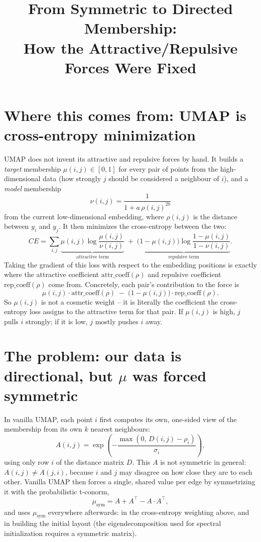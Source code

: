 \documentclass[11pt]{article}
\title{From Symmetric to Directed Membership:\\ How the Attractive/Repulsive Forces Were Fixed}
\author{}
\date{}
\begin{document}
\maketitle

\section{Where this comes from: UMAP is cross-entropy minimization}

UMAP does not invent its attractive and repulsive forces by hand. It builds a
\emph{target} membership $\mu(i,j) \in [0,1]$ for every pair of points from the
high-dimensional data (how strongly $j$ should be considered a neighbour of
$i$), and a \emph{model} membership
\[
  \nu(i,j) = \frac{1}{1 + a\,\rho(i,j)^{2b}}
\]
from the current low-dimensional embedding, where $\rho(i,j)$ is the distance
between $y_i$ and $y_j$. It then minimizes the cross-entropy between the two:
\[
  CE = \sum_{i,j}
  \underbrace{\mu(i,j)\log\frac{\mu(i,j)}{\nu(i,j)}}_{\text{attractive term}}
  \;+\;
  \underbrace{\bigl(1-\mu(i,j)\bigr)\log\frac{1-\mu(i,j)}{1-\nu(i,j)}}_{\text{repulsive term}}.
\]
Taking the gradient of this loss with respect to the embedding positions is
exactly where the attractive coefficient $\mathrm{attr\_coeff}(\rho)$ and
repulsive coefficient $\mathrm{rep\_coeff}(\rho)$ come from. Concretely, each
pair's contribution to the force is
\[
  \mu(i,j)\cdot \mathrm{attr\_coeff}(\rho) \;-\; \bigl(1-\mu(i,j)\bigr)\cdot \mathrm{rep\_coeff}(\rho).
\]
So $\mu(i,j)$ is not a cosmetic weight -- it is literally the coefficient the
cross-entropy loss assigns to the attractive term for that pair. If
$\mu(i,j)$ is high, $j$ pulls $i$ strongly; if it is low, $j$ mostly pushes
$i$ away.

\section{The problem: our data is directional, but $\mu$ was forced symmetric}

In vanilla UMAP, each point $i$ first computes its own, one-sided view of the
membership from its own $k$ nearest neighbours:
\[
  A(i,j) = \exp\!\left(-\frac{\max(0,\, D(i,j)-\rho_i)}{\sigma_i}\right),
\]
using only row $i$ of the distance matrix $D$. This $A$ is not symmetric in
general: $A(i,j) \neq A(j,i)$, because $i$ and $j$ may disagree on how close
they are to each other. Vanilla UMAP then forces a single, shared value per
edge by symmetrizing it with the probabilistic t-conorm,
\[
  \mu_{\mathrm{sym}} = A + A^{\!\top} - A \cdot A^{\!\top},
\]
and uses $\mu_{\mathrm{sym}}$ everywhere afterwards: in the cross-entropy
weighting above, and in building the initial layout (the eigendecomposition
used for spectral initialization requires a symmetric matrix).
\end{document}
